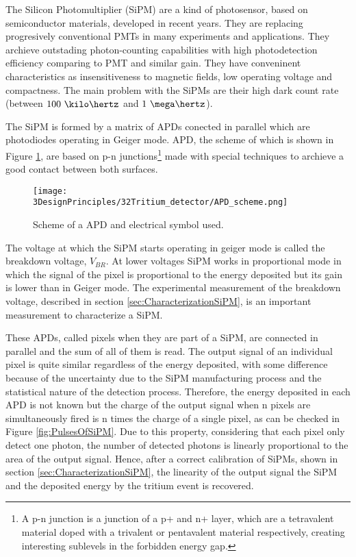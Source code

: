 The Silicon Photomultiplier (SiPM) are a kind of photosensor, based on semiconductor materials, developed in recent years. They are replacing progresively conventional PMTs in many experiments and applications. They archieve outstading photon-counting capabilities with high photodetection efficiency comparing to PMT and similar gain. They have conveninent characteristics as insensitiveness to magnetic fields, low operating voltage and compactness. The main problem with the SiPMs are their high dark count rate (between $100~\kilo\hertz$ and $1~\mega\hertz$).

The SiPM is formed by a matrix of APDs conected in parallel which are photodiodes operating in Geiger mode. APD, the scheme of which is shown in Figure \ref{fig:SchemeAPD}, are based on p-n junctions\footnote{A p-n junction is a junction of a p+ and n+ layer, which are a tetravalent material doped with a trivalent or pentavalent material respectively, creating interesting sublevels in the forbidden energy gap.} made with special techniques to archieve a good contact between both surfaces.

\begin{figure}[htbp]
\centering
\texttt{[image: 3DesignPrinciples/32Tritium\_detector/APD\_scheme.png]}
\caption{Scheme of a APD and electrical symbol used.\label{fig:SchemeAPD}~\cite{OSI}}
\end{figure}
 

The voltage at which the SiPM starts operating in geiger mode is called the breakdown voltage, $V_ {BR}$. At lower voltages SiPM works in proportional mode in which the signal of the pixel is proportional to the energy deposited but its gain is lower than in Geiger mode. The experimental measurement of the breakdown voltage, described in section \ref{sec:CharacterizationSiPM}, is an important measurement to characterize a SiPM.

These APDs, called pixels when they are part of a SiPM, are connected in parallel and the sum of all of them is read. The output signal of an individual pixel is quite similar regardless of the energy deposited, with some difference because of the uncertainty due to the SiPM manufacturing process and the statistical nature of the detection process. Therefore, the energy deposited in each APD is not known but the charge of the output signal when n pixels are simultaneously fired is n times the charge of a single pixel, as can be checked in Figure \ref{fig:PulsesOfSiPM}. Due to this property, considering that each pixel only detect one photon, the number of detected photons is linearly proportional to the area of the output signal. Hence, after a correct calibration of SiPMs, shown in section \ref{sec:CharacterizationSiPM}, the linearity of the output signal the SiPM and the deposited energy by the tritium event is recovered.

